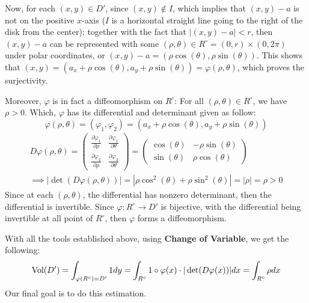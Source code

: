 \documentclass{article}
\begin{document}
Now, for each $(x,y)\in D'$, since $(x,y)\notin I$, which implies that $(x,y)-a$ is not on the positive $x$-axis ($I$ is a horizontal straight line going to the right of the disk from the center); together with the fact that $|(x,y)-a|<r$, then $(x,y)-a$ can be represented with some $(\rho,\theta)\in R^\circ = (0,r)\times (0,2\pi)$ under polar coordinates, or $(x,y)-a = (\rho\cos(\theta),\rho\sin(\theta))$. This shows that $(x,y) = (a_x+\rho\cos(\theta),a_y+\rho\sin(\theta)) = \varphi(\rho,\theta)$, which proves the surjectivity. 

Moreover, $\varphi$ is in fact a diffeomorphism on $R^\circ$: For all $(\rho,\theta)\in R^\circ$, we have $\rho>0$. Which, $\varphi$ has its differential and determinant given as follow:
\begin{equation}
    \varphi(\rho,\theta) = (\varphi_1,\varphi_2)= (a_x+\rho\cos(\theta),a_y+\rho\sin(\theta))
\end{equation}
\begin{equation}
    \begin{split}
        D\varphi(\rho,\theta)=\begin{pmatrix}
            \frac{\partial \varphi_1}{\partial \rho} & \frac{\partial \varphi_1}{\partial \theta}\\
            \frac{\partial \varphi_2}{\partial \rho} & \frac{\partial \varphi_2}{\partial \theta}
        \end{pmatrix} = \begin{pmatrix}
            \cos(\theta) & -\rho\sin(\theta)\\
            \sin(\theta) & \rho\cos(\theta)
        \end{pmatrix}\\ 
        \implies \left|\det(D\varphi(\rho,\theta))\right| = |\rho\cos^2(\theta)+\rho\sin^2(\theta)| = |\rho| = \rho >0
    \end{split}
\end{equation}
Since at each $(\rho,\theta)$, the differential has nonzero determinant, then the differential is invertible. Since $\varphi:R^\circ\rightarrow D'$ is bijective, with the differential being invertible at all point of $R^\circ$, then $\varphi$ forms a diffeomorphism.

\hfil

With all the tools established above, using \textbf{Change of Variable}, we get the following:
\begin{equation}
    \textmd{Vol}(D') = \int_{\varphi(R^\circ) = D'}1 dy = \int_{R^\circ}1\circ \varphi(x)\cdot|\det(D\varphi(x))|dx = \int_{R^\circ}\rho dx
\end{equation}
Our final goal is to do this estimation.
\end{document}

